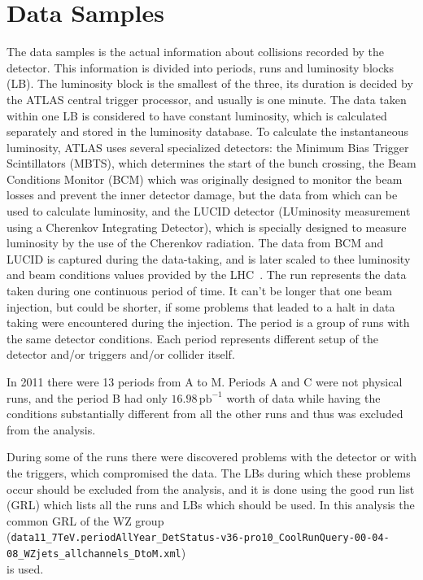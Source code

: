 \chapter{Data Samples}
\label{sec:DataSamples}

The data samples is the actual information about collisions recorded by the detector. This information is divided into periods, runs and luminosity blocks (LB). The luminosity block is the smallest of the three, its duration is decided by the ATLAS central trigger processor, and usually is one minute. The data taken within one LB is considered to have constant luminosity, which is calculated separately and stored in the luminosity database. To calculate the instantaneous luminosity, ATLAS uses several specialized detectors: the Minimum  Bias Trigger Scintillators (MBTS), which determines the start of the bunch crossing, the Beam Conditions Monitor (BCM) which was originally designed to monitor the beam losses and prevent the inner detector damage, but the data from which can be used to calculate luminosity, and the LUCID detector (LUminosity measurement using a Cherenkov Integrating Detector), which is specially designed to measure luminosity by the use of the Cherenkov radiation. The data from BCM and LUCID is captured during the data-taking, and is later scaled to thee luminosity and beam conditions values provided by the LHC~\cite{lib:lumi}. The run represents the data taken during one continuous period of time. It can't be longer that one beam injection, but could be shorter, if some problems that leaded to a halt in data taking were encountered during the injection. The period is a group of runs with the same detector conditions. Each period represents different setup of the detector and/or triggers and/or collider itself.

In 2011 there were 13 periods from A to M. Periods A and C were not physical runs, and the period B had only \ensuremath{16.98\,\mathrm{pb}^{-1}} worth of data while having the conditions substantially different from all the other runs and thus was excluded from the analysis.

During some of the runs there were discovered problems with the detector or with the triggers, which compromised the data. The LBs during which these problems occur should be excluded from the analysis, and it is done using the good run list (GRL) which lists all the runs and LBs which should be used. In this analysis the common GRL of the WZ group\\
(\texttt{\footnotesize data11\_7TeV.periodAllYear\_DetStatus-v36-pro10\_CoolRunQuery-00-04-08\_WZjets\_allchannels\_DtoM.xml})\\
is used.

